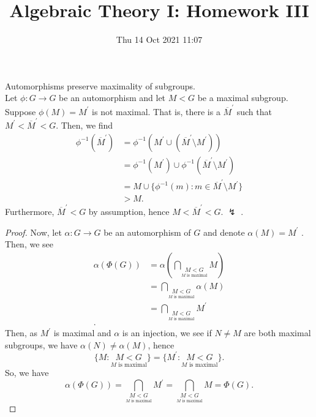 \documentclass[a4paper]{article}
\title{Algebraic Theory I: Homework III}
\date{Thu 14 Oct 2021 11:07}
\begin{document}
\maketitle
\begin{solution}[1]

\end{solution}
\newpage
\begin{lemma}
	Automorphisms preserve maximality of subgroups.\\
	Let \(\phi :G \to G\)  be an automorphism and let \(M < G\)  be a maximal subgroup. Suppose \(\phi\left( M \right) = M^{\prime} \) is not maximal. That is, there is a \(\overline{M}^{\prime}\)  such that \(M^{\prime} < \overline{M}^{\prime} < G\). Then, we find
	\begin{align*}
		\phi ^{-1}\left( \overline{M}^{\prime} \right) &=  \phi ^{-1} \left( M^{\prime} \cup \left( \overline{M}^{\prime} \setminus M^{\prime} \right)\right)  \\
							       &= \phi ^{-1}\left( M^{\prime} \right) \cup \phi ^{-1}\left( \overline{M}^{\prime} \setminus M^{\prime}\right)  \\
							       &= M \cup \{\phi^{-1}\left( m \right) : m \in \overline{M}^{\prime} \setminus M^{\prime}\}  \\
							       &> M
	.\end{align*}
Furthermore, \(\overline{M}^{\prime} < G\)  by assumption, hence \(M < \overline{M}^{\prime} < G\). \(\lightning\) .
\end{lemma}
\begin{solution}[2]
	\begin{proof}
		Now, let \(\alpha: G \to G\)  be an automorphism of \(G\) and denote \(\alpha \left( M \right)  = M^{\prime}\) . Then, we see
\begin{align*}
\alpha \left( \Phi \left( G \right)  \right)  &= \alpha\left( \bigcap_{\underset{M \text{ is maximal}}{M < G}} M \right)  \\
						      &= \bigcap_{ \underset{ M \text{ is maximal}}{M < G}} \alpha \left( M \right)   \\
						      &= \bigcap_{\underset{M \text{ is maximal}}{M < G}} M^{\prime} \\
.\end{align*}
Then, as \(M^{\prime}\) is maximal and \(\alpha\) is an injection, we see if \(N \neq M\) are both maximal subgroups, we have \(\alpha \left( N \right)  \neq \alpha \left( M \right) \), hence \[\{ M :  \underset{ M \text{ is maximal}}{M < G}\}  = \{M^{\prime} :  \underset{ M \text{ is maximal}}{M < G}\} .\] So, we have \[
	\alpha\left( \Phi \left( G \right)  \right)  = \bigcap_{ \underset{ M \text{ is maximal}}{M < G}} M^{\prime} = \bigcap_{ \underset{ M \text{ is maximal}}{M < G}} M = \Phi\left( G \right)
.\]
\end{proof}
\end{solution}
\newpage
\begin{solution}[3]

\end{solution}
\newpage

\begin{solution}[4]
\end{solution}
\newpage
\begin{solution}[5]


\end{solution}
\end{document}
